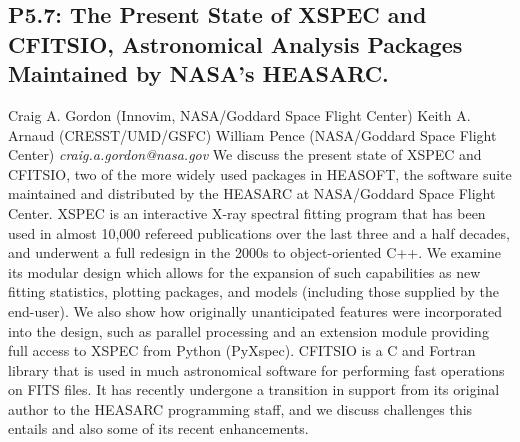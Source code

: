 \documentclass{report}
\begin{document}
\subsection*{P5.7: The Present State of XSPEC and CFITSIO, Astronomical Analysis Packages Maintained by NASA's HEASARC.}
\bigskip
Craig A. Gordon (Innovim, NASA/Goddard Space Flight Center) \newline Keith A. Arnaud (CRESST/UMD/GSFC) \newline  William Pence (NASA/Goddard Space Flight Center)\newline   \newline  \newline  \newline\newline
{\it craig.a.gordon@nasa.gov}\newline
\newline\newline
We discuss the present state of XSPEC and CFITSIO, two of the more widely used packages in HEASOFT, the software suite maintained and distributed by the HEASARC at NASA/Goddard Space Flight Center. XSPEC is an interactive X-ray spectral fitting program that has been used in almost 10,000 refereed publications over the last three and a half decades, and underwent a full redesign in the 2000s to object-oriented C++.  We examine its modular design which allows for the expansion of such capabilities as new fitting statistics, plotting packages, and models (including those supplied by the end-user).  We also show how originally unanticipated features were incorporated into the design, such as parallel processing and an extension module providing full access to XSPEC from Python (PyXspec). CFITSIO is a C and Fortran library that is used in much astronomical software for performing fast operations on FITS files. It has recently undergone a transition in support from its original author to the HEASARC programming staff, and we discuss challenges this entails and also some of its recent enhancements.\newline
\newpage
\end{document}

